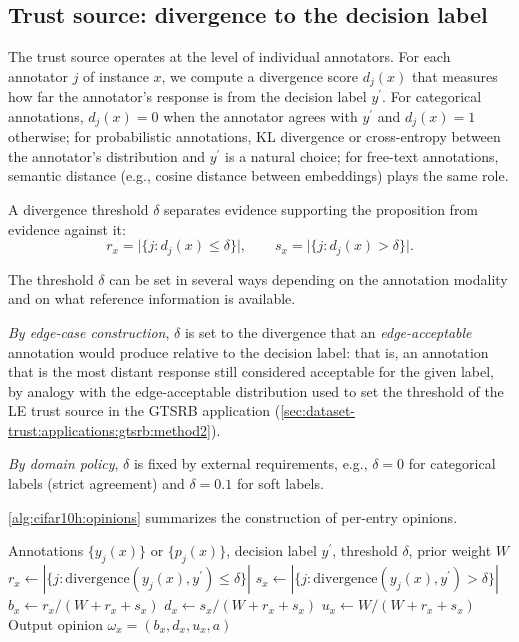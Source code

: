 \subsection{Trust source: divergence to the decision label}
\label{sec:dataset-trust:applications:cifar10h:source}

The trust source operates at the level of individual annotators. For each annotator $j$ of instance $x$, we compute a divergence score $d_j(x)$ that measures how far the annotator's response is from the decision label $y^\prime$. For categorical annotations, $d_j(x) = 0$ when the annotator agrees with $y^\prime$ and $d_j(x) = 1$ otherwise; for probabilistic annotations, \ac{KL} divergence or cross-entropy between the annotator's distribution and $y^\prime$ is a natural choice; for free-text annotations, semantic distance (e.g., cosine distance between embeddings) plays the same role.

A divergence threshold $\delta$ separates evidence supporting the proposition from evidence against it:
\begin{equation}
r_x = \big|\{j : d_j(x) \leq \delta \}\big|,
\qquad
s_x = \big|\{j : d_j(x) > \delta \}\big|.
\label{eq:cifar10h:evidence}
\end{equation}

The threshold $\delta$ can be set in several ways depending on the annotation modality and on what reference information is available.

\noindent \emph{By edge-case construction}, $\delta$ is set to the divergence that an \emph{edge-acceptable} annotation would produce relative to the decision label: that is, an annotation that is the most distant response still considered acceptable for the given label, by analogy with the edge-acceptable distribution used to set the threshold of the LE trust source in the \ac{GTSRB} application (\cref{sec:dataset-trust:applications:gtsrb:method2}).

\noindent \emph{By domain policy}, $\delta$ is fixed by external requirements, e.g., $\delta = 0$ for categorical labels (strict agreement) and $\delta = 0.1$ for soft labels.

\cref{alg:cifar10h:opinions} summarizes the construction of per-entry opinions.

\begin{algorithm}[!htbp]
\caption{Per-entry opinion construction from annotations}
\label{alg:cifar10h:opinions}
\label{alg:opinions}
\begin{algorithmic}[1]
\Require Annotations $\{y_j(x)\}$ or $\{p_j(x)\}$, decision label $y^\prime$,
threshold $\delta$, prior weight $W$
  \State $r_x \leftarrow |\{j : \mathrm{divergence}(y_j(x), y^\prime) \leq \delta \}|$
  \State $s_x \leftarrow |\{j : \mathrm{divergence}(y_j(x), y^\prime) > \delta \}|$
  \State $b_x \leftarrow r_x / (W + r_x + s_x)$
  \State $d_x \leftarrow s_x / (W + r_x + s_x)$
  \State $u_x \leftarrow W / (W + r_x + s_x)$
  \State Output opinion $\omega_x = (b_x, d_x, u_x, a)$
\EndFor
\end{algorithmic}
\end{algorithm}

